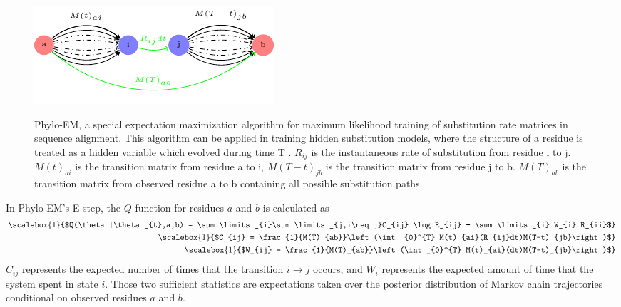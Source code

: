 \begin{figure}[H]
     \centering
     \begin{minipage}[t]{1\textwidth}
     \includegraphics[width=\linewidth]{Fig1.pdf}
     {Phylo-EM, a special expectation maximization algorithm for maximum likelihood training of substitution rate matrices in sequence alignment. This algorithm can be applied in training hidden substitution models, where the structure of a residue is treated as a hidden variable which evolved during time T \parencite{holmes2002expectation}. $R_{ij}$ is the instantaneous rate of substitution from residue i to j. $M(t)_{ai}$ is the transition matrix from residue a to i, $M(T-t)_{jb}$ is the transition matrix from residue j to b. $M(T)_{ab}$ is the transition matrix from observed residue a to b containing all possible substitution paths.\par\label{fig:phyloem}}
     \end{minipage}
\end{figure}

In Phylo-EM's E-step, the $Q$ function for residues $a$ and $b$ is calculated as
%
\begin{equation}
\label{WC}
\begin{split}
\scalebox{1}{$Q(\theta|\theta_{t},a,b) = \sum\limits_{i}\sum\limits_{j,i\neq j}C_{ij} \log R_{ij} + \sum\limits_{i} W_{i} R_{ii}$}\\
%
\scalebox{1}{$C_{ij}  = \frac{1}{M(T)_{ab}}\left (\int_{0}^{T} M(t)_{ai}(R_{ij}dt)M(T-t)_{jb}\right )$} \\
\scalebox{1}{$W_{ij}  = \frac{1}{M(T)_{ab}}\left (\int_{0}^{T} M(t)_{ai}(dt)M(T-t)_{jb}\right)$} \\
\end{split}
\end{equation}
%
$C_{ij}$ represents the expected number of times that the transition $i \rightarrow j$ occurs, and $W_{i}$ represents the expected amount of time that the system spent in state $i$. Those two sufficient statistics are expectations taken over the posterior distribution of Markov chain trajectories conditional on observed residues $a$ and $b$. 


